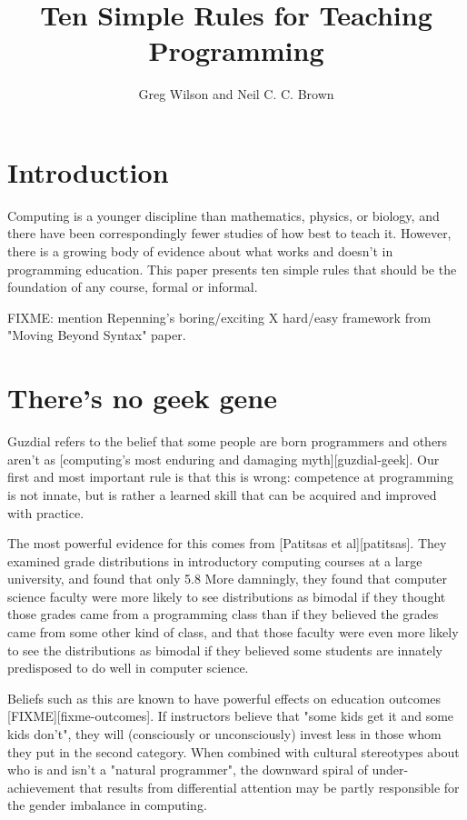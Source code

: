 \documentclass{article}
\begin{document}
\title{Ten Simple Rules for Teaching Programming}

\author{Greg Wilson and Neil C. C. Brown}


\maketitle

\section*{Introduction}

Computing is a younger discipline than mathematics, physics, or biology,
and there have been correspondingly fewer studies of how best to teach it.
However,
there is a growing body of evidence about what works and doesn't in programming education.
This paper presents ten simple rules that should be the foundation of any course,
formal or informal.

FIXME: mention Repenning's boring/exciting X hard/easy framework from "Moving Beyond Syntax" paper.

\section{There's no geek gene} %

Guzdial refers to the belief that some people are born programmers and others aren't
as [computing's most enduring and damaging myth][guzdial-geek].
Our first and most important rule is that this is wrong:
competence at programming is not innate,
but is rather a learned skill that can be acquired and improved with practice.

The most powerful evidence for this comes from [Patitsas et al][patitsas].
They examined grade distributions in introductory computing courses at a large university,
and found that only 5.8%
More damningly,
they found that computer science faculty were more likely to see distributions as bimodal
if they thought those grades came from a programming class
than if they believed the grades came from some other kind of class,
and that those faculty were even more likely to see the distributions as bimodal
if they believed some students are innately predisposed to do well in computer science.

Beliefs such as this are known to have powerful effects on education outcomes [FIXME][fixme-outcomes].
If instructors believe that "some kids get it and some kids don't",
they will (consciously or unconsciously) invest less in those whom they put in the second category.
When combined with cultural stereotypes about who is and isn't a "natural programmer",
the downward spiral of under-achievement that results from differential attention
may be partly responsible for the gender imbalance in computing.
\end{document}
